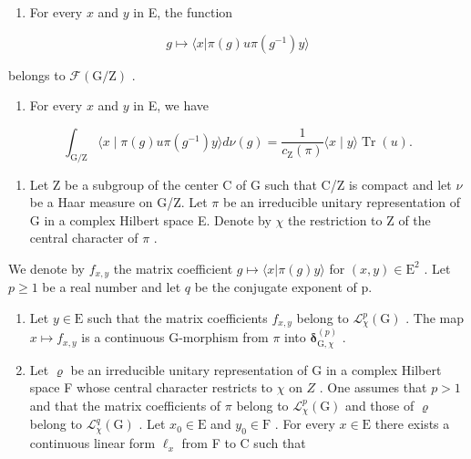 \begin{enumerate}
\def\labelenumi{\alph{enumi})}
\tightlist
\item
  For every \(x\) and \(y\) in E, the function
\end{enumerate}

\[
g \mapsto \langle x | \pi (g) u \pi (g ^ {- 1}) y \rangle
\]

belongs to \(\mathcal{F}(\mathrm{G / Z})\) .

\begin{enumerate}
\def\labelenumi{\alph{enumi})}
\setcounter{enumi}{1}
\tightlist
\item
  For every \(x\) and \(y\) in E, we have
\end{enumerate}

\[
\int_ {\mathrm{G} / \mathrm{Z}} \langle x \mid \pi (g) u \pi (g ^ {- 1}) y \rangle d \nu (g) = \frac {1}{c _ {\mathrm{Z}} (\pi)} \langle x \mid y \rangle \operatorname{Tr} (u).
\]

\begin{enumerate}
\def\labelenumi{\arabic{enumi})}
\setcounter{enumi}{14}
\tightlist
\item
  Let Z be a subgroup of the center C of G such that C/Z is compact and let \(\nu\) be a Haar measure on G/Z. Let \(\pi\) be an irreducible unitary representation of G in a complex Hilbert space E. Denote by \(\chi\) the restriction to Z of the central character of \(\pi\) .
\end{enumerate}

We denote by \(f_{x,y}\) the matrix coefficient \(g \mapsto \langle x | \pi(g)y \rangle\) for \((x, y) \in \mathrm{E}^{2}\) . Let \(p \geqslant 1\) be a real number and let \(q\) be the conjugate exponent of p.

\begin{enumerate}
\def\labelenumi{\alph{enumi})}
\item
  Let \(y \in \mathrm{E}\) such that the matrix coefficients \(f_{x,y}\) belong to \(\mathcal{L}_{\chi}^{p}(\mathrm{G})\) . The map \(x \mapsto f_{x,y}\) is a continuous G-morphism from \(\pi\) into \(\boldsymbol{\delta}_{\mathrm{G},\chi}^{(p)}\) .
\item
  Let \(\varrho\) be an irreducible unitary representation of G in a complex Hilbert space F whose central character restricts to \(\chi\) on \(Z\) . One assumes that \(p > 1\) and that the matrix coefficients of \(\pi\) belong to \(\mathcal{L}_{\chi}^{p}(\mathrm{G})\) and those of \(\varrho\) belong to \(\mathcal{L}_{\chi}^{q}(\mathrm{G})\) . Let \(x_0 \in \mathrm{E}\) and \(y_0 \in \mathrm{F}\) . For every \(x \in \mathrm{E}\) there exists a continuous linear form \(\ell_x\) from F to C such that
\end{enumerate}

